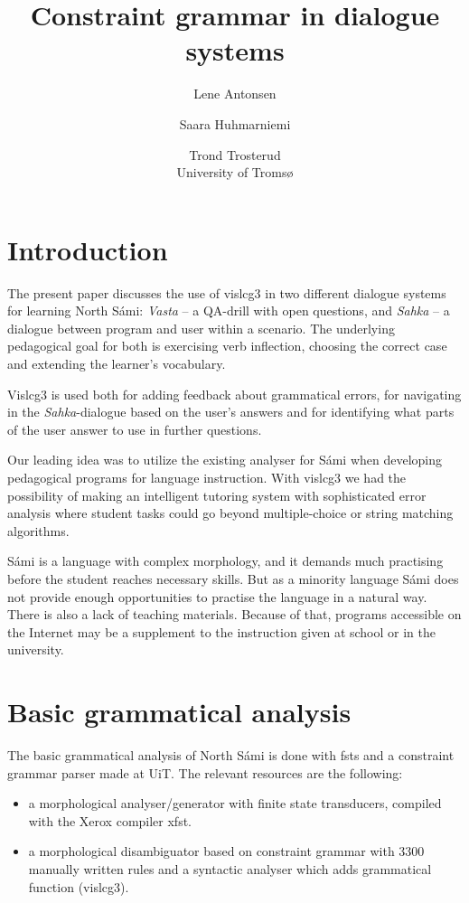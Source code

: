 \documentclass[11pt]{article}
\title{Constraint grammar in dialogue systems}
\author{Lene Antonsen  \and
              Saara Huhmarniemi \and Trond Trosterud \\ University of Tromsø}
\begin{document}

\maketitle
{}
 
\maketitle

\section{Introduction} 

The present paper discusses the use of vislcg3 in two different dialogue systems for learning North Sámi: \textit{Vasta} -- a QA-drill with open questions, and \textit{Sahka} -- a  dialogue between program and user within a scenario. The underlying pedagogical goal for both is exercising verb inflection, choosing the correct case and extending the learner's vocabulary. 

Vislcg3 is used both for adding feedback about grammatical errors, for navigating in the \textit{Sahka}-dialogue based on the user's answers and for identifying what parts of the user answer to use in further questions.

Our leading idea was to utilize the existing analyser for Sámi when developing pedagogical programs for language instruction. With vislcg3 we had the possibility of making an intelligent tutoring system with sophisticated error analysis where student tasks could go beyond multiple-choice or string matching algorithms. 

Sámi is a language with complex morphology, and it demands much practising before the student reaches necessary skills. But as a minority language Sámi does not provide enough opportunities to practise the language in a natural way. There is also a lack of teaching materials. Because of that, programs accessible on the Internet may be a supplement to the instruction given at school or in the university. 

\section{Basic grammatical analysis}
The basic grammatical analysis of North Sámi is done with fsts and a constraint grammar parser made at UiT. The relevant resources are the following:

\begin{itemize}
\item a morphological analyser/generator with finite state transducers, compiled with the Xerox compiler xfst.  
\item a morphological disambiguator based on constraint grammar with 3300 manually written rules and a syntactic analyser which adds grammatical function (vislcg3). 
\end{itemize}
\end{document}
